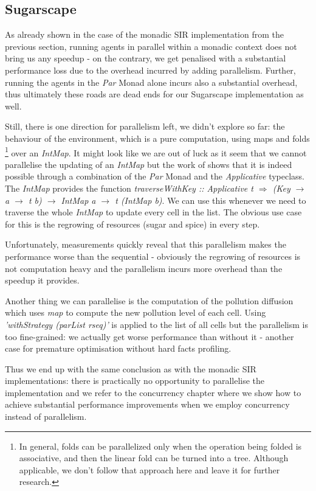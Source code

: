 \subsection{Sugarscape}
As already shown in the case of the monadic SIR implementation from the previous section, running agents in parallel within a monadic context does not bring us any speedup - on the contrary, we get penalised with a substantial performance loss due to the overhead incurred by adding parallelism. Further, running the agents in the \textit{Par} Monad alone incurs also a substantial overhead, thus ultimately these roads are dead ends for our Sugarscape implementation as well.

Still, there is one direction for parallelism left, we didn't explore so far: the behaviour of the environment, which is a pure computation, using maps and folds \footnote{In general, folds can be parallelized only when the operation being folded is associative, and then the linear fold can be turned into a tree. Although applicable, we don't follow that approach here and leave it for further research.} over an \textit{IntMap}. It might look like we are out of luck as it seem that we cannot parallelise the updating of an \textit{IntMap} but the work of \cite{marlow_parallel_2013} shows that it is indeed possible through a combination of the \textit{Par} Monad and the \textit{Applicative} typeclass. The \textit{IntMap} provides the function \textit{traverseWithKey :: Applicative t $\Rightarrow$ (Key $\rightarrow$ a $\rightarrow$ t b) $\rightarrow$ IntMap a $\rightarrow$ t (IntMap b)}. We can use this whenever we need to traverse the whole \textit{IntMap} to update every cell in the list. The obvious use case for this is the regrowing of resources (sugar and spice) in every step.

Unfortunately, measurements quickly reveal that this parallelism makes the performance worse than the sequential - obviously the regrowing of resources is not computation heavy and the parallelism incurs more overhead than the speedup it provides.

Another thing we can parallelise is the computation of the pollution diffusion which uses \textit{map} to compute the new pollution level of each cell. Using \textit{'withStrategy (parList rseq)'} is applied to the list of all cells but the parallelism is too fine-grained: we actually get worse performance than without it - another case for premature optimisation without hard facts profiling.

Thus we end up with the same conclusion as with the monadic SIR implementations: there is practically no opportunity to parallelise the implementation and we refer to the concurrency chapter where we show how to achieve substantial performance improvements when we employ concurrency instead of parallelism.